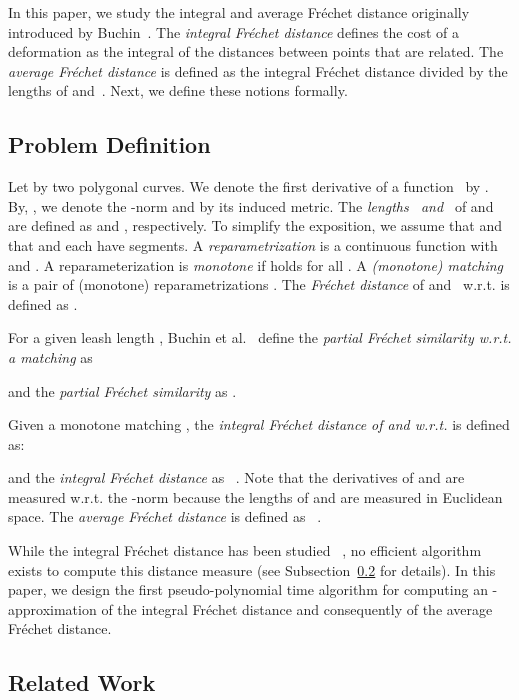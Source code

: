 \documentclass[a4paper,11pt]{article}
\begin{document}
	In this paper, we study the integral and average Fr\'{e}chet distance originally introduced by Buchin~\cite{buchin:phd}. The \emph{integral Fr\'{e}chet distance} defines the cost of a deformation as the integral of the distances between points that are related. The \emph{average Fr\'{e}chet distance} is defined as the integral Fr\'{e}chet distance divided by the lengths of  and~. Next, we define these notions formally.
\subsection{Problem Definition} 
	Let  by two polygonal curves. We denote the first derivative of a function~ by . By, , we denote the -norm and by  its induced  metric. The \emph{lengths~ and~} of  and~ are defined as  and , respectively.  To simplify the exposition, we assume that  and that  and  each have  segments. A \emph{reparametrization} is a continuous function  with  and . A reparameterization  is \emph{monotone} if  holds for all . A \emph{(monotone) matching} is a pair of (monotone) reparametrizations . The \emph{Fr\'echet distance} of  and~ w.r.t.  is defined as .
	
	For a given leash length , Buchin et al.~\cite{buchin:exact} define the \emph{partial Fr\'{e}chet similarity  w.r.t. a matching } as
	 	
	and the \emph{partial Fr\'{e}chet similarity} as .
		
	Given a monotone matching , the \emph{integral Fr\'echet distance  of  and  w.r.t. } is defined as:
		
	and the \emph{integral Fr\'{e}chet distance} as ~\cite{buchin:phd}. Note that the derivatives of  and  are measured w.r.t. the -norm because the lengths of  and  are measured in  Euclidean space.  The \emph{average Fr\'{e}chet distance} is defined as ~\cite{buchin:phd}.
	
	 While the integral Fr\'{e}chet distance has been studied ~\cite[p. 860]{wenk:vehicle}, no  efficient algorithm exists to compute this distance measure (see Subsection~\ref{subsec:rel} for details).  In this paper, we design  the first pseudo-polynomial time algorithm for computing an -approximation of the integral Fr\'{e}chet distance and consequently of the average Fr\'{e}chet distance.\\
\subsection{Related Work} \label{subsec:rel} 
\end{document}
